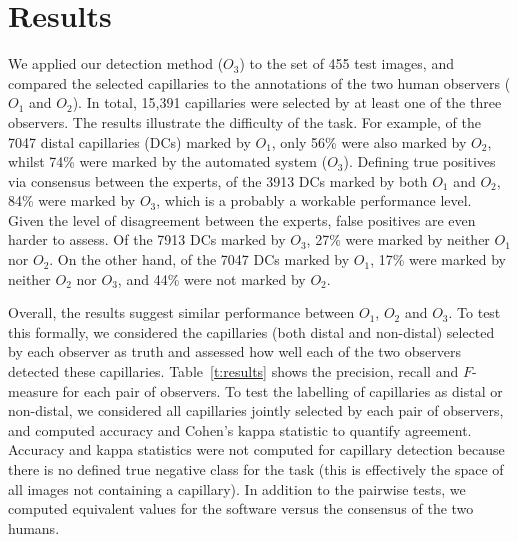 \documentclass[runningheads,a4paper]{llncs}
\newcommand{\tref}[1]{Table~\ref{#1}}
\begin{document}
\section{Results}
\label{s:results}
%
We applied our detection method ($O_3$) to the set of 455 test images, and compared the selected capillaries to the annotations of the two human observers ($O_1$ and $O_2$). In total, 15,391 capillaries were selected by at least one of the three observers. The results illustrate the difficulty of the task. For example, of the 7047 distal capillaries (DCs) marked by $O_1$, only 56\% were also marked by $O_2$, whilst 74\% were marked by the automated system ($O_3$). Defining true positives via consensus between the experts, of the 3913 DCs marked by both $O_1$ and $O_2$, 84\% were marked by $O_3$, which is a probably a workable performance level. Given the level of disagreement between the experts, false positives are even harder to assess. Of the 7913 DCs marked by $O_3$, 27\% were marked by neither $O_1$ nor $O_2$. On the other hand, of the 7047 DCs marked by $O_1$, 17\% were marked by neither $O_2$ nor $O_3$, and 44\% were not marked by $O_2$.

Overall, the results suggest similar performance between $O_1$, $O_2$ and $O_3$. To test this formally, we considered the capillaries (both distal and non-distal) selected by each observer as truth and assessed how well each of the two observers detected these capillaries. \tref{t:results} shows the precision, recall  and $F$-measure for each pair of observers. To test the labelling of capillaries as distal or non-distal, we considered all capillaries jointly selected by each pair of observers, and computed accuracy and Cohen's kappa statistic to quantify agreement. Accuracy and kappa statistics were not computed for capillary detection because there is no defined true negative class for the task (this is effectively the space of all images not containing a capillary). In addition to the pairwise tests, we computed equivalent values for the software versus the consensus of the two humans.
\end{document}
